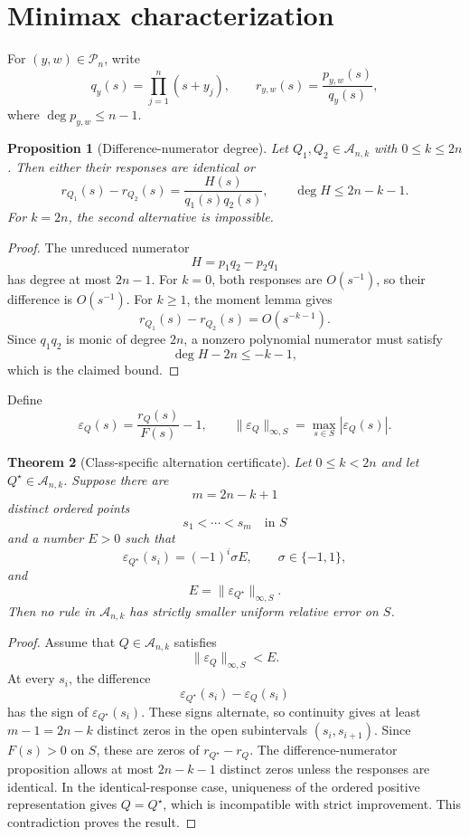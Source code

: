 \documentclass[preprint,12pt]{elsarticle}
\newtheorem{theorem}{Theorem}
\newtheorem{proposition}[theorem]{Proposition}
\theoremstyle{remark}
\begin{document}
\section{Minimax characterization}

For \((y,w)\in\mathcal P_n\), write
\[
q_y(s)=\prod_{j=1}^{n}(s+y_j),
\qquad
r_{y,w}(s)=\frac{p_{y,w}(s)}{q_y(s)},
\]
where \(\deg p_{y,w}\leq n-1\).

\begin{proposition}[Difference-numerator degree]
Let \(Q_1,Q_2\in\mathcal A_{n,k}\) with \(0\leq k\leq2n\). Then either
their responses are identical or
\[
r_{Q_1}(s)-r_{Q_2}(s)
=
\frac{H(s)}{q_1(s)q_2(s)},
\qquad
\deg H\leq2n-k-1.
\]
For \(k=2n\), the second alternative is impossible.
\end{proposition}

\begin{proof}
The unreduced numerator
\[
H=p_1q_2-p_2q_1
\]
has degree at most \(2n-1\). For \(k=0\), both responses are
\(O(s^{-1})\), so their difference is \(O(s^{-1})\). For \(k\geq1\),
the moment lemma gives
\[
r_{Q_1}(s)-r_{Q_2}(s)=O(s^{-k-1}).
\]
Since \(q_1q_2\) is monic of degree \(2n\), a nonzero polynomial
numerator must satisfy
\[
\deg H-2n\leq-k-1,
\]
which is the claimed bound.
\end{proof}

Define
\[
\varepsilon_Q(s)=\frac{r_Q(s)}{F(s)}-1,
\qquad
\|\varepsilon_Q\|_{\infty,S}
=
\max_{s\in S}|\varepsilon_Q(s)|.
\]

\begin{theorem}[Class-specific alternation certificate]
Let \(0\leq k<2n\) and let \(Q^\star\in\mathcal A_{n,k}\). Suppose
there are
\[
m=2n-k+1
\]
distinct ordered points
\[
s_1<\cdots<s_m
\quad\text{in }S
\]
and a number \(E>0\) such that
\[
\varepsilon_{Q^\star}(s_i)=(-1)^i\sigma E,
\qquad
\sigma\in\{-1,1\},
\]
and
\[
E=\|\varepsilon_{Q^\star}\|_{\infty,S}.
\]
Then no rule in \(\mathcal A_{n,k}\) has strictly smaller uniform
relative error on \(S\).
\end{theorem}

\begin{proof}
Assume that \(Q\in\mathcal A_{n,k}\) satisfies
\[
\|\varepsilon_Q\|_{\infty,S}<E.
\]
At every \(s_i\), the difference
\[
\varepsilon_{Q^\star}(s_i)-\varepsilon_Q(s_i)
\]
has the sign of \(\varepsilon_{Q^\star}(s_i)\). These signs alternate,
so continuity gives at least \(m-1=2n-k\) distinct zeros in the open
subintervals \((s_i,s_{i+1})\). Since \(F(s)>0\) on \(S\), these are
zeros of \(r_{Q^\star}-r_Q\). The difference-numerator proposition
allows at most \(2n-k-1\) distinct zeros unless the responses are
identical. In the identical-response case, uniqueness of the ordered
positive representation gives \(Q=Q^\star\), which is incompatible
with strict improvement. This contradiction proves the result.
\end{proof}
\end{document}
